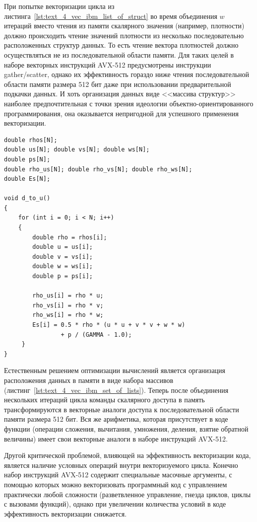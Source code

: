 При попытке векторизации цикла из листинга~\ref{lst:text_4_vec_ibm_list_of_struct} во время объединения $w$ итераций вместо чтения из памяти скалярного значения (например, плотности) должно происходить чтение значений плотности из несколько последовательно расположенных структур данных.
То есть чтение вектора плотностей должно осуществляться не из последовательной области памяти.
Для таких целей в наборе векторных инструкций AVX-512\label{abbr:avx-10} предусмотрены инструкции gather/scatter, однако их эффективность гораздо ниже чтения последовательной области памяти размера 512 бит даже при использовании предварительной подкачки данных.
И хоть организация данных виде <<массива структур>> наиболее предпочтительная с точки зрения идеологии объектно-ориентированного программирования, она оказывается непригодной для успешного применения векторизации.

\begin{lstlisting}[caption={Организация данных в виде <<набор массивов>>.},label={lst:text_4_vec_ibm_set_of_lists}]
double rhos[N];
double us[N]; double vs[N]; double ws[N];
double ps[N];
double rho_us[N]; double rho_vs[N]; double rho_ws[N];
double Es[N];

void d_to_u()
{
    for (int i = 0; i < N; i++)
    {
        double rho = rhos[i];
        double u = us[i];
        double v = vs[i];
        double w = ws[i];
        double p = ps[i];

        rho_us[i] = rho * u;
        rho_vs[i] = rho * v;
        rho_ws[i] = rho * w;
        Es[i] = 0.5 * rho * (u * u + v * v + w * w)
                + p / (GAMMA - 1.0);
     }
}
\end{lstlisting}

Естественным решением оптимизации вычислений является организация расположения данных в памяти в виде набора массивов (листинг~\ref{lst:text_4_vec_ibm_set_of_lists}).
Теперь после объединения нескольких итераций цикла команды скалярного доступа в память трансформируются в векторные аналоги доступа к последовательной области памяти размера 512 бит.
Вся же арифметика, которая присутствует в коде функции (операции сложения, вычитания, умножения, деления, взятие обратной величины) имеет свои векторные аналоги в наборе инструкций AVX-512.

Другой критической проблемой, влияющей на эффективность векторизации кода, является наличие условных операций внутри векторизуемого цикла.
Конечно набор инструкций AVX-512 содержит специальные масочные аргументы, с помощью которых можно векторизовать программный код с управлением практически любой сложности (разветвленное управление, гнезда циклов, циклы с вызовами функций), однако при увеличении количества условий в коде эффективность векторизации снижается.

